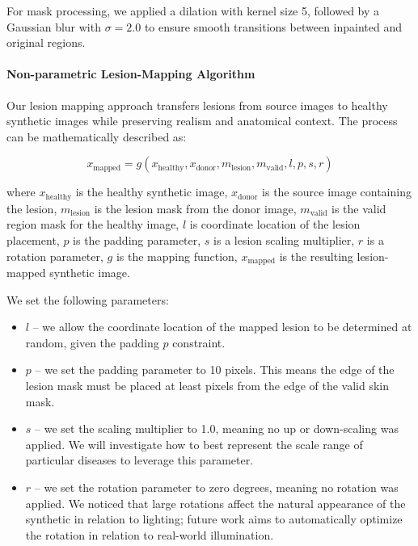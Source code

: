 \documentclass[11pt]{ucthesis}
\begin{document}
For mask processing, we applied a dilation with kernel size 5, followed by a Gaussian blur with $\sigma = 2.0$ to ensure smooth transitions between inpainted and original regions.

\paragraph{Non-parametric Lesion-Mapping Algorithm}
Our lesion mapping approach transfers lesions from source images to healthy synthetic images while preserving realism and anatomical context. The process can be mathematically described as:

\begin{equation}
x_{\text{mapped}} = g(x_{\text{healthy}}, x_{\text{donor}}, m_{\text{lesion}}, m_{\text{valid}}, l, p, s, r)
\end{equation}

where $x_{\text{healthy}}$ is the healthy synthetic image, $x_{\text{donor}}$ is the source image containing the lesion, $m_{\text{lesion}}$ is the lesion mask from the donor image, $m_{\text{valid}}$ is the valid region mask for the healthy image, $l$ is coordinate location of the lesion placement, $p$ is the padding parameter, $s$ is a lesion scaling multiplier, $r$ is a rotation parameter, $g$ is the mapping function, $x_{\text{mapped}}$ is the resulting lesion-mapped synthetic image.

We set the following parameters:
\begin{itemize}
    \item $l$ -- we allow the coordinate location of the mapped lesion to be determined at random, given the padding $p$ constraint.
    \item $p$ -- we set the padding parameter to 10 pixels. This means the edge of the lesion mask must be placed at least pixels from the edge of the valid skin mask.
    \item $s$ -- we set the scaling multiplier to 1.0, meaning no up or down-scaling was applied. We will investigate how to best represent the scale range of particular diseases to leverage this parameter.
    \item $r$ -- we set the rotation parameter to zero degrees, meaning no rotation was applied. We noticed that large rotations affect the natural appearance of the synthetic in relation to lighting; future work aims to automatically optimize the rotation in relation to real-world illumination.
\end{itemize}
\end{document}
